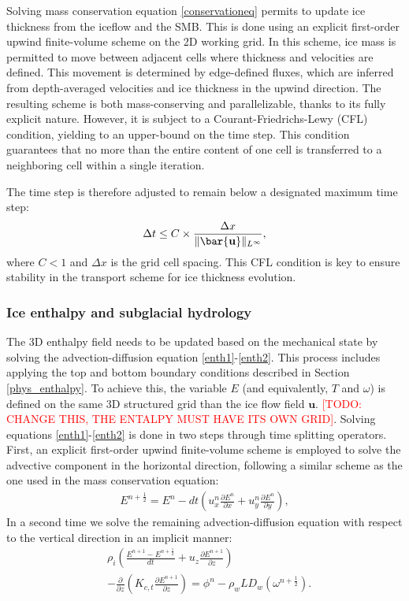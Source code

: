 \documentclass[gmd]{copernicus}
\begin{document}
Solving mass conservation equation \eqref{conservationeq} permits to update ice thickness from the iceflow and the SMB. This is done using an explicit first-order upwind finite-volume scheme on the 2D working grid. In this scheme, ice mass is permitted to move between adjacent cells where thickness and velocities are defined. This movement is determined by edge-defined fluxes, which are inferred from depth-averaged velocities and ice thickness in the upwind direction. The resulting scheme is both mass-conserving and parallelizable, thanks to its fully explicit nature. However, it is subject to a Courant-Friedrichs-Lewy (CFL) condition, yielding to an upper-bound on the time step. This condition guarantees that no more than the entire content of one cell is transferred to a neighboring cell within a single iteration.

The time step is therefore adjusted to remain below a designated maximum time step:
\begin{equation}
\Delta t \le  C \times \frac{ \Delta x }{ \Vert \bar{\bf u } \Vert_{L^{\infty}} },
\label{cfl}
\end{equation}
where $C<1$ and $\Delta x$ is the grid cell spacing. This CFL condition is key to ensure stability in the transport scheme for ice thickness evolution.

\subsubsection{Ice enthalpy and subglacial hydrology}
\label{num_enthalpy}

The 3D enthalpy field needs to be updated based on the mechanical state by solving the advection-diffusion equation \eqref{enth1}-\eqref{enth2}. This process includes applying the top and bottom boundary conditions described in Section \ref{phys_enthalpy}. To achieve this, the variable $E$ (and equivalently, $T$ and $\omega$) is defined on the same 3D structured grid than the ice flow field $\mathbf{u}$. \textcolor{red}{[TODO: CHANGE THIS, THE ENTALPY MUST HAVE ITS OWN GRID]}. Solving equations \eqref{enth1}-\eqref{enth2} is done in two steps through time splitting operators. First, an explicit first-order upwind finite-volume scheme is employed to solve the advective component in the horizontal direction, following a similar scheme as the one used in the mass conservation equation:
\begin{align}
 E^{n+\frac12}  = E^n - dt \left( u^n_x \frac{\partial E^n}{ \partial x} 
  + u^n_y \frac{\partial E^n}{ \partial y} \right),
\label{E_step1}
\end{align}
In a second time we solve the remaining advection-diffusion equation with respect to the vertical direction in an implicit manner:
\begin{align}
& \rho_i \left( \frac{E^{n+1}-E^{n+\frac12}}{ dt}
+ u_z \frac{\partial E^{n+1}}{ \partial z} \right) \\
& - \frac{\partial }{\partial z} \left(
K_{c,t} \frac{\partial E^{n+1}}{ \partial z} \right) 
 = \phi^n - \rho_w L D_w(\omega^{n+\frac12}).
\label{E_step2}
\end{align}
\end{document}
